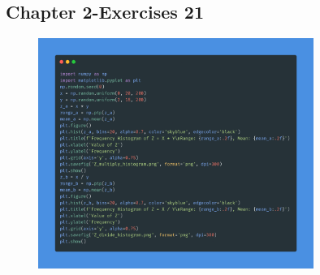 \documentclass[a4paper,12pt]{article}
\begin{document}
\subsection{Chapter 2-Exercises 21}
\begin{figure}[h!]
    \centering
    \includegraphics[width=0.8\textwidth]{./Screenshots/Exercise1.7.py.png} 
\end{figure} \\
\end{document}
